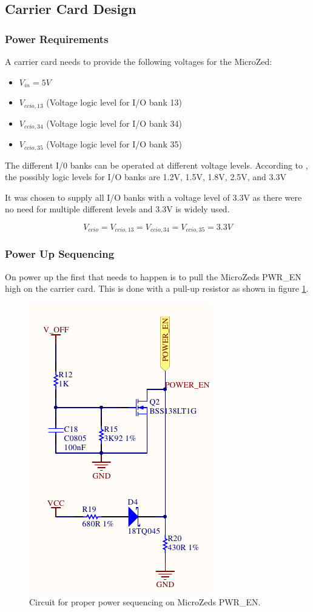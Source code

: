 \subsection{Carrier Card Design}
\label{sub:carrier_design}

\subsubsection*{Power Requirements}
\label{sub:power_req}
A carrier card  needs to provide the following voltages for the MicroZed:
\begin{itemize}
	\item $V_{in} = 5V$
	\item $V_{ccio,13}$ (Voltage logic level for I/O bank 13)
	\item $V_{ccio,34}$ (Voltage logic level for I/O bank 34)
	\item $V_{ccio,35}$ (Voltage logic level for I/O bank 35)
\end{itemize}
The different I/0 banks can be operated at different voltage levels.
According to \cite{zynq_dc}, the possibly logic levels for I/O banks are 1.2V, 1.5V, 1.8V, 2.5V, and 3.3V 

It was chosen to supply all I/O banks with a voltage level of 3.3V as there were no need for multiple different levels and 3.3V is widely used.

$$ V_{ccio} =  V_{ccio,13} = V_{ccio,34} = V_{ccio,35} = 3.3V$$

\subsubsection*{Power Up Sequencing}
On power up the first that needs to happen is to pull the MicroZeds PWR\_EN high on the carrier card.
This is done with a pull-up resistor as shown in figure \ref{fig:pwr_en_circuit}.

\begin{figure}
	\centering
	\includegraphics[width=.4\linewidth]{graphics/power_en_sch.pdf}
	\caption{Circuit for proper power sequencing on MicroZeds PWR\_EN.}
	\label{fig:pwr_en_circuit}
\end{figure}

